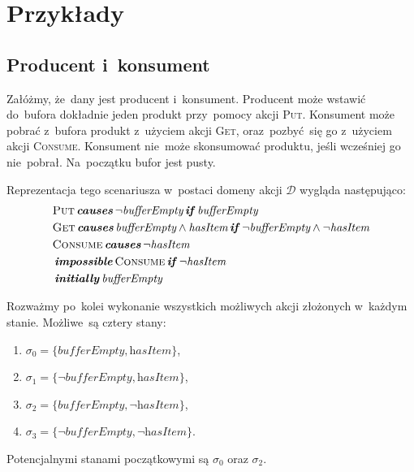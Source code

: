 \documentclass[11pt,a4paper]{article}
\DeclareMathOperator{\Initially}{\textbf{\textit{initially}}}
\DeclareMathOperator{\Causes}{\textbf{\textit{causes}}}
\DeclareMathOperator{\If}{\textbf{\textit{if}}}
\DeclareMathOperator{\Impossible}{\textbf{\textit{impossible}}}
\begin{document}
\section{Przykłady}

\subsection{Producent i~konsument}

Załóżmy, że~dany jest producent i~konsument.
Producent może wstawić do~bufora dokładnie jeden produkt przy~pomocy akcji \textsc{Put}.
Konsument może pobrać z~bufora produkt z~użyciem akcji \textsc{Get},
oraz~pozbyć~się go z~użyciem akcji \textsc{Consume}.
Konsument nie~może skonsumować produktu, jeśli wcześniej go nie~pobrał.
Na~początku bufor jest pusty.

Reprezentacja tego scenariusza w~postaci domeny akcji $\mathcal{D}$ wygląda następująco:
\begin{align*}
    & \textsc{Put} \Causes \neg \textit{bufferEmpty} \If \textit{bufferEmpty} \\
    & \textsc{Get} \Causes \textit{bufferEmpty} \land \textit{hasItem} \If \neg \textit{bufferEmpty} \land \neg \textit{hasItem} \\
    & \textsc{Consume} \Causes \neg \textit{hasItem} \\
    & \Impossible \textsc{Consume} \If \neg \textit{hasItem} \\
    & \Initially \textit{bufferEmpty}
\end{align*}

Rozważmy po~kolei wykonanie wszystkich możliwych akcji złożonych w~każdym stanie. Możliwe~są cztery stany:

\begin{enumerate}
    \item $\sigma_0 = \{ \textit{bufferEmpty}, \textit{hasItem} \}$,
    \item $\sigma_1 = \{ \neg \textit{bufferEmpty}, \textit{hasItem} \}$,
    \item $\sigma_2 = \{ \textit{bufferEmpty}, \neg \textit{hasItem} \}$,
    \item $\sigma_3 = \{ \neg \textit{bufferEmpty}, \neg \textit{hasItem} \}$.
\end{enumerate}

Potencjalnymi stanami początkowymi są $\sigma_0$ oraz $\sigma_2$.
\end{document}
